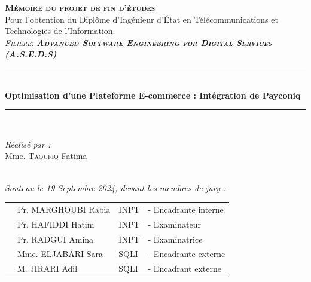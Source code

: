 \vspace{0.4cm}
\begin{center}
{\large \textsc{\textbf{Mémoire du projet de fin d'études}}}\\[0.1cm]
{\large {Pour l’obtention du Diplôme d’Ingénieur d’État en Télécommunications 
et Technologies de l’Information.}}\\[0.1cm]
{\large \textsc{\textit{Filière:\textbf{ Advanced Software Engineering for Digital Services (A.S.E.D.S)}}}} \\[0.05cm] 
\vspace{0.4cm}
\vspace{-0.04cm}
\rule{\linewidth}{0.3mm} \\[0.3cm]   %
 { \huge \textbf{Optimisation d'une Plateforme E-commerce : Intégration de Payconiq}} \\[0.15cm] 
\rule{\linewidth}{0.3mm} \\[0.3cm]



\vspace{0.8cm}

\noindent
\begin{minipage}{0.9\textwidth}
    \vspace{-7mm}
  \begin{flushleft} \large
    \emph{Réalisé par :}\\
    Mme. \textsc{Taoufiq} Fatima %
  \end{flushleft}
\end{minipage}
\begin{minipage}{0.4\textwidth}

\end{minipage}\\[0.3cm]

{\large \textit{Soutenu le 19 Septembre 2024, devant les membres de jury : }}\\[0.3cm]


\begin{tabular}{p{1cm}lll}
  & \large Pr. MARGHOUBI Rabia & \large INPT & \large - Encadrante interne  \\[0.1cm]
  & \large Pr. HAFIDDI Hatim & \large INPT & \large - Examinateur \\[0.1cm]
  & \large Pr. RADGUI Amina & \large INPT & \large - Examinatrice  \\[0.1cm]
  & \large Mme. ELJABARI Sara & \large SQLI & \large - Encadrante externe  \\[0.1cm]
  & \large M. JIRARI Adil & \large SQLI & \large - Encadrant externe  \\[0.1cm]



\end{tabular}
\end{center}
